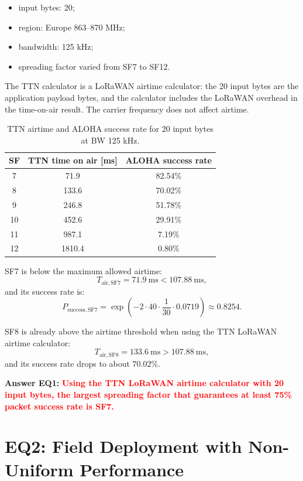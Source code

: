 \documentclass[a4paper,11pt]{article}
\newcommand{\answer}[1]{\textbf{\textcolor{red}{#1}}}
\begin{document}
\begin{itemize}
    \item input bytes: 20;
    \item region: Europe 863--870 MHz;
    \item bandwidth: 125 kHz;
    \item spreading factor varied from SF7 to SF12.
\end{itemize}

The TTN calculator is a LoRaWAN airtime calculator: the 20 input bytes are the
application payload bytes, and the calculator includes the LoRaWAN overhead in
the time-on-air result. The carrier frequency does not affect airtime.

\begin{table}[H]
\centering
\begin{tabular}{ccc}
\toprule
SF & TTN time on air [ms] & ALOHA success rate \\
\midrule
7  & 71.9   & 82.54\% \\
8  & 133.6  & 70.02\% \\
9  & 246.8  & 51.78\% \\
10 & 452.6  & 29.91\% \\
11 & 987.1  & 7.19\% \\
12 & 1810.4 & 0.80\% \\
\bottomrule
\end{tabular}
\caption{TTN airtime and ALOHA success rate for 20 input bytes at BW 125 kHz.}
\end{table}

SF7 is below the maximum allowed airtime:
\[
  T_{\mathrm{air,SF7}} = 71.9\ \mathrm{ms} < 107.88\ \mathrm{ms},
\]
and its success rate is:
\[
  P_{\mathrm{success,SF7}}
  = \exp\left(-2 \cdot 40 \cdot \frac{1}{30} \cdot 0.0719\right)
  \approx 0.8254.
\]

SF8 is already above the airtime threshold when using the TTN LoRaWAN airtime
calculator:
\[
  T_{\mathrm{air,SF8}} = 133.6\ \mathrm{ms} > 107.88\ \mathrm{ms},
\]
and its success rate drops to about $70.02\%$.

\textbf{Answer EQ1:} \answer{Using the TTN LoRaWAN airtime calculator with 20 input bytes, the largest spreading factor that guarantees at least 75\% packet success rate is SF7.}

\section*{EQ2: Field Deployment with Non-Uniform Performance}
\end{document}
